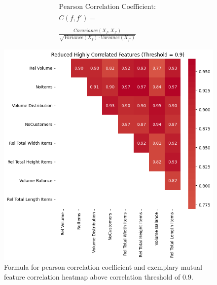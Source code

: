 \begin{figure}[ht]
    \centering
    \begin{minipage}{.48\linewidth}
        \begin{gather*}
            \text{Pearson Correlation Coefficient: } \\\\C(f,f') = \\\\\frac{Covariance(X_f,X_{f'})}{\sqrt{Variance(X_f)\cdot Variance(X_{f'})}}
        \end{gather*}
    \end{minipage}%
    \begin{minipage}{.48\linewidth}
        \includegraphics[width=\linewidth]{pictures/exemplary_small_correlation_matrix.png}
    \end{minipage}
    \caption[Formula for pearson correlation coefficient and exemplary mutual feature correlation heatmap.]
    {Formula for pearson correlation coefficient and exemplary mutual feature correlation heatmap above correlation threshold of 0.9.}
    \label{fig:pearson_correlation_example}
\end{figure}

